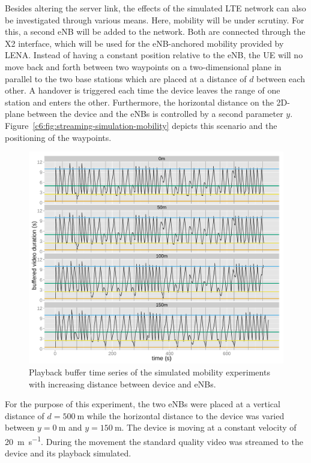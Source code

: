 Besides altering the server link, the effects of the simulated \gls{LTE} network can also be investigated through various means. Here, mobility will be under scrutiny. For this, a second \gls{eNB} will be added to the network. Both are connected through the X2 interface, which will be used for the \gls{eNB}-anchored mobility provided by LENA. Instead of having a constant position relative to the \gls{eNB}, the \gls{UE} will no move back and forth between two waypoints on a two-dimensional plane in parallel to the two base stations which are placed at a distance of $d$ between each other. A handover is triggered each time the device leaves the range of one station and enters the other. Furthermore, the horizontal distance on the 2D-plane between the device and the \glspl{eNB} is controlled by a second parameter $y$. Figure~\ref{c6:fig:streaming-simulation-mobility} depicts this scenario and the positioning of the waypoints.

\begin{figure}[htb]
	\centering
	\includegraphics[width=1.0\textwidth]{images/R-ltesim-plotbuffer-mobility-facets.pdf}
	\caption{Playback buffer time series of the simulated mobility experiments with increasing distance between device and \glspl{eNB}.}
\label{c6:fig:ltesim-mobility-plotbuffer-facets}
\end{figure}

For the purpose of this experiment, the two \glspl{eNB} were placed at a vertical distance of $d=\SI{500}{\meter}$ while the horizontal distance to the device was varied between $y=\SI{0}{\meter}$ and $y=\SI{150}{\meter}$. The device is moving at a constant velocity of \SI{20}{\meter\per\second}. During the movement the standard quality video was streamed to the device and its playback simulated. 

